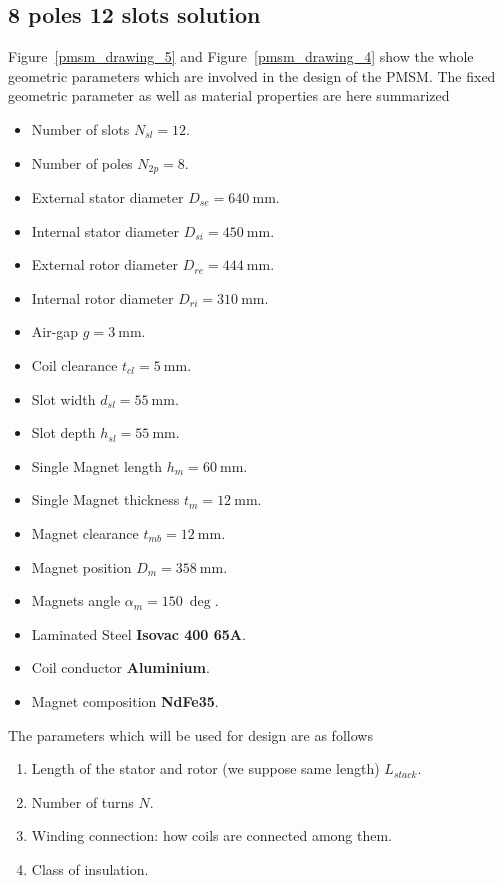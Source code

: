 \documentclass[11pt,a4paper,oneside]{book}
\begin{document}
\begin{onehalfspace}
\section{8 poles 12 slots solution}
Figure~\ref{pmsm_drawing_5} and Figure~\ref{pmsm_drawing_4} show the whole geometric parameters which are involved in the design of the PMSM. The fixed geometric parameter as well as material properties are here summarized
\begin{itemize}
	\item Number of slots $N_{sl}=12$.	
	\item Number of poles $N_{2p}=8$.
	\item External stator diameter $D_{se}=\SI{640}{\milli\meter}$.
	\item Internal stator diameter $D_{si}=\SI{450}{\milli\meter}$.
	\item External rotor diameter $D_{re}=\SI{444}{\milli\meter}$.
	\item Internal rotor diameter $D_{ri}=\SI{310}{\milli\meter}$.
	\item Air-gap $g=\SI{3}{\milli\meter}$.
	\item Coil clearance $t_{cl}=\SI{5}{\milli\meter}$.
	\item Slot width $d_{sl}=\SI{55}{\milli\meter}$.
	\item Slot depth $h_{sl}=\SI{55}{\milli\meter}$.
	\item Single Magnet length $h_{m}=\SI{60}{\milli\meter}$.
	\item Single Magnet thickness $t_{m}=\SI{12}{\milli\meter}$.
	\item Magnet clearance $t_{mb}=\SI{12}{\milli\meter}$.
	\item Magnet position $D_{m}=\SI{358}{\milli\meter}$.
	\item Magnets angle $\alpha_{m}=\SI{150}{\deg}$.
	\item Laminated Steel \textbf{Isovac 400 65A}.
	\item Coil conductor \textbf{Aluminium}.
	\item Magnet composition \textbf{NdFe35}.
\end{itemize}
The parameters which will be used for design are as follows
\begin{enumerate}
	\item Length of the stator and rotor (we suppose same length) $L_{stack}$.
	\item Number of turns $N$.
	\item Winding connection: how coils are connected among them.
	\item Class of insulation.

\end{enumerate}
\end{onehalfspace}
\end{document}

